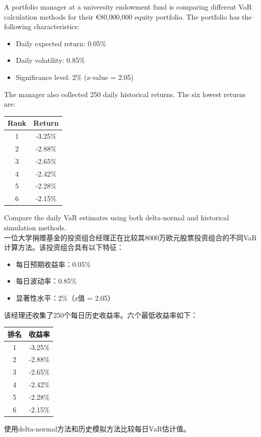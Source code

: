 \documentclass{article}
\newcounter{question} %
\begin{document}
\begin{question}
    A portfolio manager at a university endowment fund is comparing different VaR calculation methods for their €80,000,000 equity portfolio. The portfolio has the following characteristics:

    \begin{itemize}
        \item Daily expected return: 0.05\%
        \item Daily volatility: 0.85\%
        \item Significance level: 2\% (z-value = 2.05)
    \end{itemize}

    The manager also collected 250 daily historical returns. The six lowest returns are:
    \begin{center}
    \begin{tabular}{|c|c|}
    \hline
    Rank & Return \\
    \hline
    1 & -3.25\% \\
    \hline
    2 & -2.88\% \\
    \hline
    3 & -2.65\% \\
    \hline
    4 & -2.42\% \\
    \hline
    5 & -2.28\% \\
    \hline
    6 & -2.15\% \\
    \hline
    \end{tabular}
    \end{center}

    Compare the daily VaR estimates using both delta-normal and historical simulation methods.
    \\一位大学捐赠基金的投资组合经理正在比较其8000万欧元股票投资组合的不同VaR计算方法。该投资组合具有以下特征：

    \begin{itemize}
        \item 每日预期收益率：0.05\%
        \item 每日波动率：0.85\%
        \item 显著性水平：2\%（z值 = 2.05）
    \end{itemize}

    该经理还收集了250个每日历史收益率。六个最低收益率如下：
    \begin{center}
    \begin{tabular}{|c|c|}
    \hline
    排名 & 收益率 \\
    \hline
    1 & -3.25\% \\
    \hline
    2 & -2.88\% \\
    \hline
    3 & -2.65\% \\
    \hline
    4 & -2.42\% \\
    \hline
    5 & -2.28\% \\
    \hline
    6 & -2.15\% \\
    \hline
    \end{tabular}
    \end{center}

    使用delta-normal方法和历史模拟方法比较每日VaR估计值。
\end{question}
\end{document}
